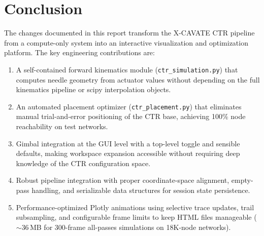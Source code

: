 \documentclass[11pt,a4paper]{article}
\newcommand{\filename}[1]{\texttt{\textcolor{accentblue}{#1}}}
\begin{document}
\section{Conclusion}

The changes documented in this report transform the X-CAVATE CTR pipeline from a compute-only system into an interactive visualization and optimization platform. The key engineering contributions are:

\begin{enumerate}[label=\textbf{\arabic*.}]
    \item A self-contained forward kinematics module (\filename{ctr\_simulation.py}) that computes needle geometry from actuator values without depending on the full kinematics pipeline or scipy interpolation objects.

    \item An automated placement optimizer (\filename{ctr\_placement.py}) that eliminates manual trial-and-error positioning of the CTR base, achieving 100\% node reachability on test networks.

    \item Gimbal integration at the GUI level with a top-level toggle and sensible defaults, making workspace expansion accessible without requiring deep knowledge of the CTR configuration space.

    \item Robust pipeline integration with proper coordinate-space alignment, empty-pass handling, and serializable data structures for session state persistence.

    \item Performance-optimized Plotly animations using selective trace updates, trail subsampling, and configurable frame limits to keep HTML files manageable ($\sim$36\,MB for 300-frame all-passes simulations on 18K-node networks).
\end{enumerate}
\end{document}
